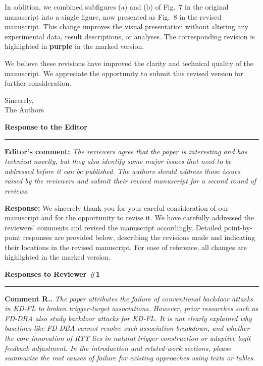 \documentclass[11pt,a4paper]{article}
\newcounter{reviewernum}
\newcounter{commentnum}
\newcommand{\reviewersection}[1]{%
  \clearpage
  \setcounter{reviewernum}{#1}%
  \setcounter{commentnum}{0}%
  \vspace{0.7em}%
  {\Large\bfseries\color{headingnavy}\hypertarget{reviewer:#1}{Responses to Reviewer \##1}\par}%
  \vspace{0.25em}\hrule\vspace{0.85em}%
}
\newcommand{\reviewcomment}[1]{%
  \stepcounter{commentnum}%
  \begin{tcolorbox}[
      enhanced,breakable,colback=black!3,colframe=black!20,
      boxrule=0.5pt,arc=1.2mm,left=9pt,right=9pt,top=8pt,bottom=8pt]
    {\bfseries Comment R\arabic{reviewernum}.\arabic{commentnum}.}\quad
    {\itshape #1}
  \end{tcolorbox}%
}
\begin{document}
In addition, we combined subfigures (a) and (b) of Fig.~7 in the original manuscript into a single figure, now presented as Fig.~8 in the revised manuscript.
This change improves the visual presentation without altering any experimental data, result descriptions, or analyses.
The corresponding revision is highlighted in \textcolor{share}{\textbf{purple}} in the marked version.

We believe these revisions have improved the clarity and technical quality of the manuscript.
We appreciate the opportunity to submit this revised version for further consideration.

\vspace{3em}
Sincerely,\\
The Authors

\clearpage

{\Large\bfseries\color{headingnavy}Response to the Editor}\par
\vspace{0.25em}\hrule\vspace{0.8em}

\begin{tcolorbox}[
    enhanced,breakable,colback=black!3,colframe=black!20,
    boxrule=0.5pt,arc=1.2mm,left=9pt,right=9pt,top=8pt,bottom=8pt]
  {\bfseries Editor's comment:}\quad
  {\itshape The reviewers agree that the paper is interesting and has technical novelty, but they also identify some major issues that need to be addressed before it can be published. 
  The authors should address those issues raised by the reviewers and submit their revised manuscript for a second round of reviews.}
\end{tcolorbox}


\textbf{\color{replyblue}Response:} We sincerely thank you for your careful consideration of our manuscript and for the opportunity to revise it. 
We have carefully addressed the reviewers' comments and revised the manuscript accordingly.
Detailed point-by-point responses are provided below, describing the revisions made and indicating their locations in the revised manuscript. 
For ease of reference, all changes are highlighted in the marked version.

\reviewersection{1}

\reviewcomment{The paper attributes the failure of conventional backdoor attacks in KD‑FL to broken trigger‑target associations. However, prior researches such as FD‑DBA also study backdoor attacks for KD‑FL. It is not clearly explained why baselines like FD‑DBA cannot resolve such association breakdown, and whether the core innovation of RTT lies in natural trigger construction or adaptive logit feedback adjustment. In the introduction and related‑work sections, please summarize the root causes of failure for existing approaches using texts or tables.}
\end{document}
